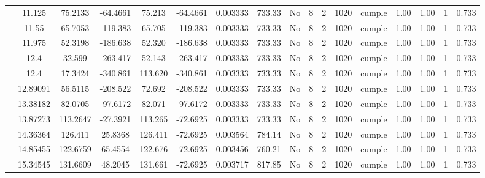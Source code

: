 \begin{table}[H]
{\begin{tabular}{|c|c|c|c|c|c|c|c|c|c|c|c|c|c|c|c|c|}
\cline{2-17}        & 11.125 & 75.2133 & -64.4661 & 75.213 & -64.4661 & 0.003333 & 733.33 & No  & 8   & 2   & 1020 & \cellcolor[rgb]{ .776,  .937,  .808}cumple & 1.00 & 1.00 & 1   & 0.733 \bigstrut\\
\cline{2-17}        & 11.55 & 65.7053 & -119.383 & 65.705 & -119.383 & 0.003333 & 733.33 & No  & 8   & 2   & 1020 & \cellcolor[rgb]{ .776,  .937,  .808}cumple & 1.00 & 1.00 & 1   & 0.733 \bigstrut\\
\cline{2-17}        & 11.975 & 52.3198 & -186.638 & 52.320 & -186.638 & 0.003333 & 733.33 & No  & 8   & 2   & 1020 & \cellcolor[rgb]{ .776,  .937,  .808}cumple & 1.00 & 1.00 & 1   & 0.733 \bigstrut\\
\cline{2-17}        & \cellcolor[rgb]{ .851,  .882,  .949}12.4 & 32.599 & -263.417 & 52.143 & -263.417 & 0.003333 & 733.33 & No  & 8   & 2   & 1020 & \cellcolor[rgb]{ .776,  .937,  .808}cumple & 1.00 & 1.00 & 1   & 0.733 \bigstrut\\
\cline{2-17}        & \cellcolor[rgb]{ .851,  .882,  .949}12.4 & 17.3424 & -340.861 & 113.620 & -340.861 & 0.003333 & 733.33 & No  & 8   & 2   & 1020 & \cellcolor[rgb]{ .776,  .937,  .808}cumple & 1.00 & 1.00 & 1   & 0.733 \bigstrut\\
\cline{2-17}        & 12.89091 & 56.5115 & -208.522 & 72.692 & -208.522 & 0.003333 & 733.33 & No  & 8   & 2   & 1020 & \cellcolor[rgb]{ .776,  .937,  .808}cumple & 1.00 & 1.00 & 1   & 0.733 \bigstrut\\
\cline{2-17}        & 13.38182 & 82.0705 & -97.6172 & 82.071 & -97.6172 & 0.003333 & 733.33 & No  & 8   & 2   & 1020 & \cellcolor[rgb]{ .776,  .937,  .808}cumple & 1.00 & 1.00 & 1   & 0.733 \bigstrut\\
\cline{2-17}        & 13.87273 & 113.2647 & -27.3921 & 113.265 & -72.6925 & 0.003333 & 733.33 & No  & 8   & 2   & 1020 & \cellcolor[rgb]{ .776,  .937,  .808}cumple & 1.00 & 1.00 & 1   & 0.733 \bigstrut\\
\cline{2-17}        & 14.36364 & 126.411 & 25.8368 & 126.411 & -72.6925 & 0.003564 & 784.14 & No  & 8   & 2   & 1020 & \cellcolor[rgb]{ .776,  .937,  .808}cumple & 1.00 & 1.00 & 1   & 0.733 \bigstrut\\
\cline{2-17}        & 14.85455 & 122.6759 & 65.4554 & 122.676 & -72.6925 & 0.003456 & 760.21 & No  & 8   & 2   & 1020 & \cellcolor[rgb]{ .776,  .937,  .808}cumple & 1.00 & 1.00 & 1   & 0.733 \bigstrut\\
\cline{2-17}        & 15.34545 & 131.6609 & 48.2045 & 131.661 & -72.6925 & 0.003717 & 817.85 & No  & 8   & 2   & 1020 & \cellcolor[rgb]{ .776,  .937,  .808}cumple & 1.00 & 1.00 & 1   & 0.733 \bigstrut\\

\end{tabular}}
\end{table}
